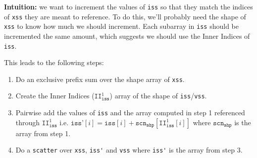 \documentclass{article}
\begin{document}
\textbf{Intuition:} we want to increment the values of \verb|iss| so that they
match the indices of \verb|xss| they are meant to reference. To do this, we'll
probably need the shape of \verb|xss| to know how much we should increment. Each
subarray in \verb|iss| should be incremented the same amount, which suggests we
should use the Inner Indices of \verb|iss|.

This leads to the following steps:
\begin{enumerate}
    \item Do an exclusive prefix sum over the shape array of \verb|xss|.
    \item Create the Inner Indices ($\texttt{II}^1_{\texttt{iss}}$) array of the
        shape of \verb|iss|/\verb|vss|.
    \item Pairwise add the values of \verb|iss| and the array computed in step 1
        referenced through $\texttt{II}^1_{\texttt{iss}}$ i.e. $\texttt{iss'}[i]
        = \texttt{iss}[i] + \texttt{scn}_{\texttt{shp}} \left[
            \texttt{II}^1_{\texttt{iss}}[i] \right]$ where
        $\texttt{scn}_{\texttt{shp}}$ is the array from step 1.
    \item Do a \verb|scatter| over \verb|xss|, \verb|iss'| and \verb|vss| where
        \verb|iss'| is the array from step 3.
\end{enumerate}

\end{document}
